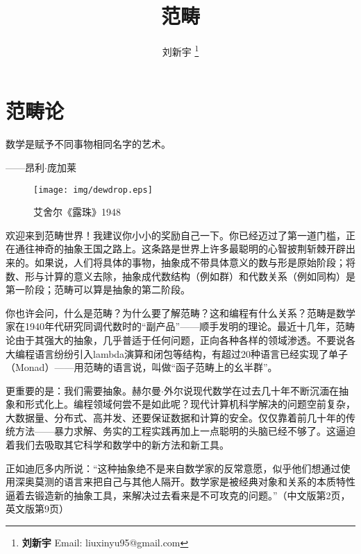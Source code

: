 \documentclass{article}
\begin{document}
\title{范畴}

\author{刘新宇
\thanks{{\bfseries 刘新宇} \newline
  Email: liuxinyu95@gmail.com \newline}
  }

\maketitle
\fi


\ifx\wholebook\relax
\chapter{范畴论}
\fi

\epigraph{数学是赋予不同事物相同名字的艺术。}{——昂利$\cdot$庞加莱}


\begin{wrapfigure}{R}{0.4\textwidth}
 \centering
 \texttt{[image: img/dewdrop.eps]}
 \captionsetup{labelformat=empty}
 \caption{艾舍尔《露珠》1948}
 \label{fig:Escher-Dewdrop-1948}
\end{wrapfigure}

欢迎来到范畴世界！我建议你小小的奖励自己一下。你已经迈过了第一道门槛，正在通往神奇的抽象王国之路上。这条路是世界上许多最聪明的心智披荆斩棘开辟出来的。如果说，人们将具体的事物，抽象成不带具体意义的数与形是原始阶段；将数、形与计算的意义去除，抽象成代数结构（例如群）和代数关系（例如同构）是第一阶段；范畴可以算是抽象的第二阶段。

你也许会问，什么是范畴？为什么要了解范畴？这和编程有什么关系？范畴是数学家在1940年代研究同调代数时的“副产品”——顺手发明的理论。最近十几年，范畴论由于其强大的抽象，几乎普适于任何问题，正向各种各样的领域渗透。不要说各大编程语言纷纷引入lambda演算和闭包等结构，有超过20种语言已经实现了单子（Monad）\cite{Monad-Haskell-Wiki}——用范畴的语言说，叫做“函子范畴上的幺半群”。

更重要的是：我们需要抽象。赫尔曼$\cdot$外尔说现代数学在过去几十年不断沉湎在抽象和形式化上。编程领域何尝不是如此呢？现代计算机科学解决的问题空前复杂，大数据量、分布式、高并发、还要保证数据和计算的安全。仅仅靠着前几十年的传统方法——暴力求解、务实的工程实践再加上一点聪明的头脑已经不够了。这逼迫着我们去吸取其它科学和数学中的新方法和新工具。

正如迪厄多内所说：“这种抽象绝不是来自数学家的反常意愿，似乎他们想通过使用深奥莫测的语言来把自己与其他人隔开。数学家是被经典对象和关系的本质特性逼着去锻造新的抽象工具，来解决过去看来是不可攻克的问题。”\cite{Dieudonne1987}（中文版第2页，英文版第9页）
\end{document}
